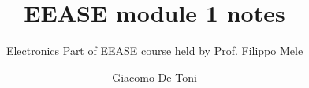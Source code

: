 \documentclass{GDTReportClass}
\title{EEASE module 1 notes}  %
\subtitle{Electronics Part of EEASE course held by Prof. Filippo Mele}  %
\author{Giacomo De Toni}  %
\begin{document}
    \settingfrontmatter  %

    \settingmaincontent  

    
    
    
    
    
    
    
    
    
    
    
    
    
\end{document}
